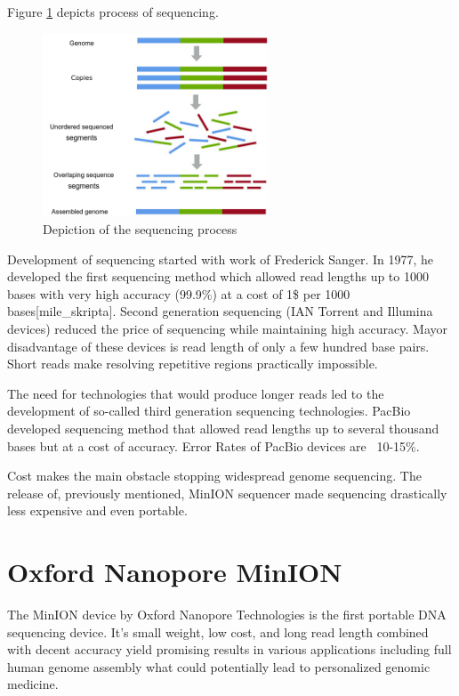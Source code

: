 \documentclass[times, utf8, diplomski, numeric, english]{fer}
\begin{document}
Figure \ref{fg:sequencing} depicts process of sequencing.

\begin{figure}[!ht]
	\begin{center}
		\includegraphics[width=0.6\textwidth]{./imgs/sequencing.png}
		\caption{Depiction of the sequencing process}
		\label{fg:sequencing}
	\end{center}
\end{figure}


Development of sequencing started with work of Frederick Sanger\cite{mile}\cite{Pettersson2009}. In 1977, he developed the first sequencing method which allowed 
read lengths up to 1000 bases with very high accuracy (99.9\%) at a cost of 1\$ per 1000 bases[mile\_skripta].
Second generation sequencing (IAN Torrent and Illumina devices) reduced the price of sequencing while maintaining high accuracy. Mayor disadvantage of these devices is read length of only a few hundred base pairs. Short reads make resolving repetitive regions practically impossible.

The need for technologies that would produce longer reads led to the development of so-called third generation sequencing technologies.
PacBio developed sequencing method that allowed read lengths up to several thousand bases but at a cost of accuracy. Error Rates of PacBio devices are ~10-15\%. 

Cost makes the main obstacle stopping widespread genome sequencing. The release of, previously mentioned, MinION sequencer made sequencing drastically less expensive and even portable.


\section{Oxford Nanopore MinION}

The MinION device by Oxford Nanopore Technologies is the first portable DNA sequencing device. It’s small weight, low cost, and long read length combined with decent accuracy yield promising results in various applications including full human genome assembly\cite{human_seq} what could potentially lead to personalized genomic medicine.
\end{document}
